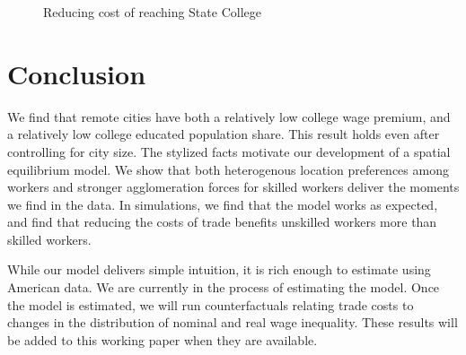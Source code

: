 \documentclass[12 pt]{article}
\begin{document}
\begin{figure}[ht!]

\centering
\caption{\label{fig:sim_res} Reducing cost of reaching State College}
\end{figure}

\section{Conclusion}

We find that remote cities have both a relatively low college wage premium, and a relatively low college educated population share.  This result holds even after controlling for city size.  The stylized facts motivate our development of a spatial equilibrium model.  We show that both heterogenous location preferences among workers and stronger agglomeration forces for skilled workers deliver the moments we find in the data.  In simulations, we find that the model works as expected, and find that reducing the costs of trade benefits unskilled workers more than skilled workers.

While our model delivers simple intuition, it is rich enough to estimate using American data.  We are currently in the process of estimating the model.  Once the model is estimated, we will run counterfactuals relating trade costs to changes in the distribution of nominal and real wage inequality.  These results will be added to this working paper when they are available.
\end{document}

